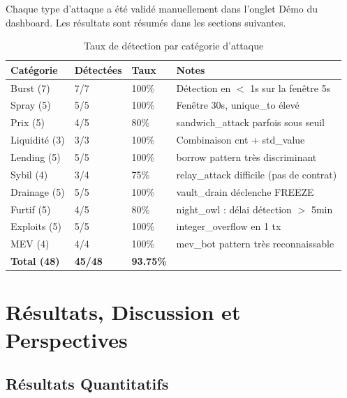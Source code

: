 \documentclass[12pt,a4paper]{report}
\begin{document}
Chaque type d'attaque a été validé manuellement dans l'onglet Démo du dashboard. Les résultats sont résumés dans les sections suivantes.

\begin{table}[H]
\centering
\caption{Taux de détection par catégorie d'attaque}
\label{tab:detection_rates}
\begin{tabularx}{\linewidth}{L{3.5cm} C{2cm} C{2cm} L{5cm}}
\toprule
\textbf{Catégorie} & \textbf{Détectées} & \textbf{Taux} & \textbf{Notes} \\
\midrule
Burst (7) & 7/7 & 100\% & Détection en $<$ 1s sur la fenêtre 5s \\
Spray (5) & 5/5 & 100\% & Fenêtre 30s, unique\_to élevé \\
Prix (5) & 4/5 & 80\% & sandwich\_attack parfois sous seuil \\
Liquidité (3) & 3/3 & 100\% & Combinaison cnt + std\_value \\
Lending (5) & 5/5 & 100\% & borrow pattern très discriminant \\
Sybil (4) & 3/4 & 75\% & relay\_attack difficile (pas de contrat) \\
Drainage (5) & 5/5 & 100\% & vault\_drain déclenche FREEZE \\
Furtif (5) & 4/5 & 80\% & night\_owl : délai détection $>$ 5min \\
Exploits (5) & 5/5 & 100\% & integer\_overflow en 1 tx \\
MEV (4) & 4/4 & 100\% & mev\_bot pattern très reconnaissable \\
\midrule
\textbf{Total (48)} & \textbf{45/48} & \textbf{93.75\%} & \\
\bottomrule
\end{tabularx}
\end{table}

\chapter{Résultats, Discussion et Perspectives}
\vspace{0pt}
\vspace{1cm}

\section{Résultats Quantitatifs}
\end{document}

